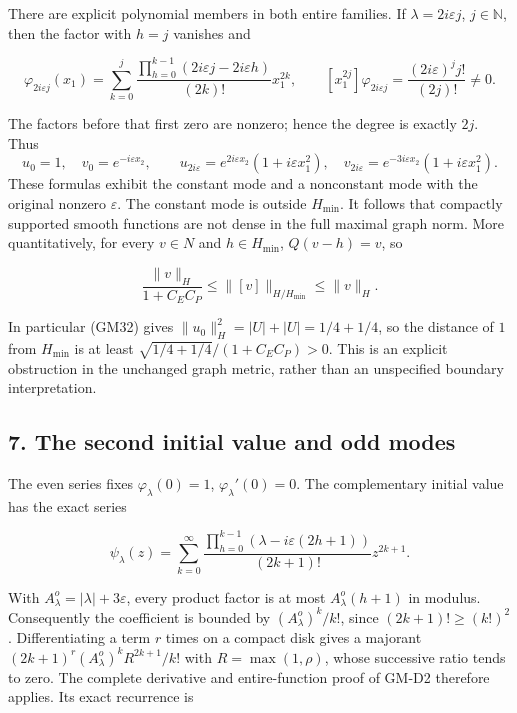 \documentclass[
  11pt,
]{article}
\begin{document}
There are explicit polynomial members in both entire families. If
\(\lambda=2i\varepsilon j\), \(j\in\mathbb N\), then the factor
with \(h=j\) vanishes and

\[
 \varphi_{2i\varepsilon j}(x_1)
     =\sum_{k=0}^j\frac{\prod_{h=0}^{k-1}(2i\varepsilon j-2i\varepsilon h)}{(2k)!}x_1^{2k},
 \qquad
 [x_1^{2j}]\varphi_{2i\varepsilon j}
       =\frac{(2i\varepsilon)^j j!}{(2j)!}\neq0.
 \tag{GM44}
\]

The factors before that first zero are nonzero; hence the degree is
exactly \(2j\). Thus \[
 u_0=1,\quad v_0=e^{-i\varepsilon x_2},\qquad
 u_{2i\varepsilon}=e^{2i\varepsilon x_2}(1+i\varepsilon x_1^2),
 \quad v_{2i\varepsilon}=e^{-3i\varepsilon x_2}(1+i\varepsilon x_1^2).
 \tag{GM45}
\]
These formulas exhibit the constant mode and a nonconstant mode with the
original nonzero \(\varepsilon\). The constant mode is
outside \(H_{\min}\). It follows that compactly supported
smooth functions are not dense in the full maximal graph norm. More
quantitatively, for every \(v\in N\) and
\(h\in H_{\min}\), \(Q(v-h)=v\), so

\[
 \frac{\|v\|_H}{1+C_EC_P}
       \leq\|[v]\|_{H/H_{\min}}\leq\|v\|_H.
 \tag{GM46}
\]

In particular (GM32) gives \(\|u_0\|_H^2=|U|+|U|=1/4+1/4\), so the distance
of \(1\) from \(H_{\min}\) is at
least \(\sqrt{1/4+1/4}/(1+C_EC_P)>0\). This is an explicit obstruction in the
unchanged graph metric, rather than an unspecified boundary
interpretation.

\subsection{7. The second initial value and odd
modes}\label{the-second-initial-value-and-odd-modes}

The even series fixes \(\varphi_\lambda(0)=1\),
\(\varphi_\lambda'(0)=0\). The complementary initial value has the
exact series

\[
 \psi_\lambda(z)
     =\sum_{k=0}^\infty
       \frac{\prod_{h=0}^{k-1}(\lambda-i\varepsilon(2h+1))}{(2k+1)!}z^{2k+1}.
 \tag{GM47}
\]

With \(A^o_\lambda=|\lambda|+3\varepsilon\), every product factor is at most
\(A^o_\lambda(h+1)\) in modulus. Consequently the coefficient is
bounded by \((A^o_\lambda)^k/k!\), since \((2k+1)!\geq(k!)^2\).
Differentiating a term \(r\) times on a compact
disk gives a majorant \((2k+1)^r(A^o_\lambda)^k R^{2k+1}/k!\) with
\(R=\max(1,\rho)\), whose successive ratio tends to zero. The
complete derivative and entire-function proof of GM-D2 therefore
applies. Its exact recurrence is
\end{document}
